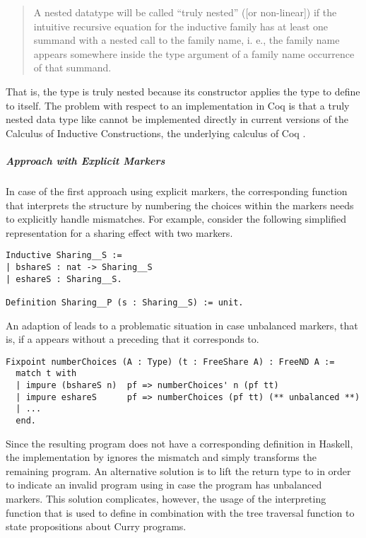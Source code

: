 \begin{quote}
A nested datatype will be called “truly nested” ([or non-linear]) if the intuitive recursive equation for the inductive family has at least one summand with a nested call to the family name, i. e., the family name appears somewhere inside the type argument of a family name occurrence of that summand.
\end{quote}

That is, the type  is truly nested because its constructor  applies the type to define to itself.
The problem with respect to an implementation in Coq is that a truly nested data type like  cannot be implemented directly in current versions of the Calculus of Inductive Constructions, the underlying calculus of Coq \citep{matthes2008recursion}.

\subparagraph{Approach with Explicit Markers}
In case of the first approach using explicit markers, the corresponding function that interprets the  structure by numbering the choices within the markers needs to explicitly handle mismatches.
For example, consider the following simplified representation for a sharing effect with two markers.

\begin{verbatim}
Inductive Sharing__S :=
| bshareS : nat -> Sharing__S
| eshareS : Sharing__S.

Definition Sharing__P (s : Sharing__S) := unit.
\end{verbatim}

An adaption of  leads to a problematic situation in case unbalanced markers, that is, if a  appears without a preceding  that it corresponds to.

\begin{verbatim}
Fixpoint numberChoices (A : Type) (t : FreeShare A) : FreeND A :=
  match t with
  | impure (bshareS n)  pf => numberChoices' n (pf tt)
  | impure eshareS      pf => numberChoices (pf tt) (** unbalanced **)
  | ...
  end.
\end{verbatim}

Since the resulting program does not have a corresponding definition in Haskell, the implementation by \citeauthor{bunkenburg2019modeling} ignores the mismatch and simply transforms the remaining program.
An alternative solution is to lift the return type to  in order to indicate an invalid program using  in case the program has unbalanced markers.
This solution complicates, however, the usage of the interpreting function  that is used to define in combination with the tree traversal function  to state propositions about Curry programs.


